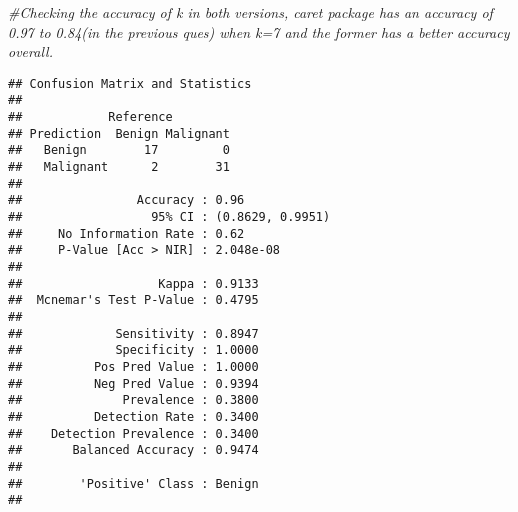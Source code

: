 \documentclass[]{article}
\newenvironment{Shaded}{\begin{snugshade}}{\end{snugshade}}
\newcommand{\KeywordTok}[1]{\textcolor[rgb]{0.13,0.29,0.53}{\textbf{#1}}}
\newcommand{\CommentTok}[1]{\textcolor[rgb]{0.56,0.35,0.01}{\textit{#1}}}
\newcommand{\OperatorTok}[1]{\textcolor[rgb]{0.81,0.36,0.00}{\textbf{#1}}}
\newcommand{\NormalTok}[1]{#1}
\begin{document}
\begin{Shaded}
\begin{Highlighting}[]
\CommentTok{#Checking the accuracy of k in both versions, caret package has an accuracy of 0.97 to 0.84(in the previous ques) when k=7 and the former has a better accuracy overall.}
\end{Highlighting}
\end{Shaded}

\begin{Shaded}
\end{Shaded}

\begin{verbatim}
## Confusion Matrix and Statistics
## 
##            Reference
## Prediction  Benign Malignant
##   Benign        17         0
##   Malignant      2        31
##                                           
##                Accuracy : 0.96            
##                  95% CI : (0.8629, 0.9951)
##     No Information Rate : 0.62            
##     P-Value [Acc > NIR] : 2.048e-08       
##                                           
##                   Kappa : 0.9133          
##  Mcnemar's Test P-Value : 0.4795          
##                                           
##             Sensitivity : 0.8947          
##             Specificity : 1.0000          
##          Pos Pred Value : 1.0000          
##          Neg Pred Value : 0.9394          
##              Prevalence : 0.3800          
##          Detection Rate : 0.3400          
##    Detection Prevalence : 0.3400          
##       Balanced Accuracy : 0.9474          
##                                           
##        'Positive' Class : Benign          
## 
\end{verbatim}

\begin{Shaded}
\end{Shaded}
\end{document}
